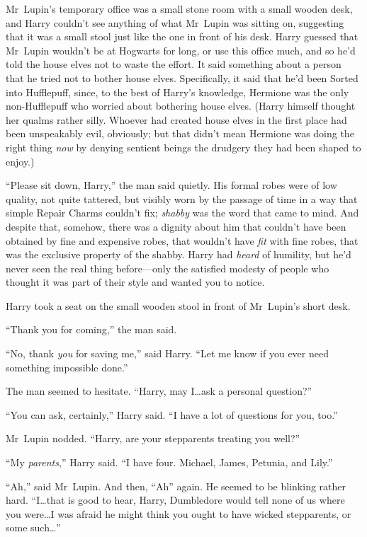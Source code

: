 Mr~Lupin’s temporary office was a small stone room with a small wooden desk,
and Harry couldn’t see anything of what Mr~Lupin was sitting on, suggesting
that it was a small stool just like the one in front of his desk. Harry guessed
that Mr~Lupin wouldn’t be at Hogwarts for long, or use this office much, and
so he’d told the house elves not to waste the effort. It said something about a
person that he tried not to bother house elves. Specifically, it said that he’d
been Sorted into Hufflepuff, since, to the best of Harry’s knowledge, Hermione
was the only non-Hufflepuff who worried about bothering house elves. (Harry
himself thought her qualms rather silly. Whoever had created house elves in the
first place had been unspeakably evil, obviously; but that didn’t mean Hermione
was doing the right thing \emph{now} by denying sentient beings the drudgery
they had been shaped to enjoy.)

“Please sit down, Harry,” the man said quietly. His formal robes were of low
quality, not quite tattered, but visibly worn by the passage of time in a way
that simple Repair Charms couldn’t fix; \emph{shabby} was the word that came to
mind. And despite that, somehow, there was a dignity about him that couldn’t
have been obtained by fine and expensive robes, that wouldn’t have \emph{fit}
with fine robes, that was the exclusive property of the shabby. Harry had
\emph{heard} of humility, but he’d never seen the real thing before—only the
satisfied modesty of people who thought it was part of their style and wanted
you to notice.

Harry took a seat on the small wooden stool in front of Mr~Lupin’s short desk.

“Thank you for coming,” the man said.

“No, thank \emph{you} for saving me,” said Harry. “Let me know if you ever need
something impossible done.”

The man seemed to hesitate. “Harry, may I…ask a personal question?”

“You can ask, certainly,” Harry said. “I have a lot of questions for you, too.”

Mr~Lupin nodded. “Harry, are your stepparents treating you well?”

“My \emph{parents},” Harry said. “I have four. Michael, James, Petunia, and
Lily.”

“Ah,” said Mr~Lupin. And then, “Ah” again. He seemed to be blinking rather
hard. “I…that is good to hear, Harry, Dumbledore would tell none of us
where you were…I was afraid he might think you ought to have wicked
stepparents, or some such…”

